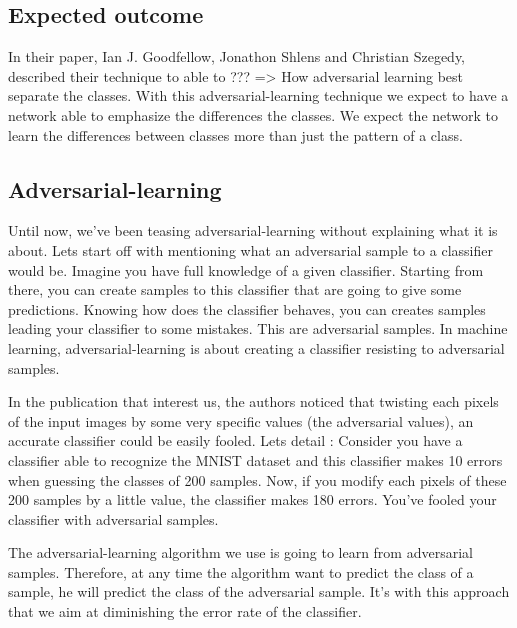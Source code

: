 	\subsection{Expected outcome}
		In their paper, Ian J. Goodfellow, Jonathon Shlens and Christian Szegedy, described their technique to able to ??? 
		=> How adversarial learning best separate the classes.
		With this adversarial-learning technique we expect to have a network able to emphasize the differences the classes. We expect the network to learn the differences between classes more than just the pattern of a class.


	\subsection{Adversarial-learning}
		Until now, we've been teasing adversarial-learning without explaining what it is about. Lets start off with mentioning what an adversarial sample to a classifier would be. Imagine you have full knowledge of a given classifier. Starting from there, you can create samples to this classifier that are going to give some predictions. Knowing how does the classifier behaves, you can creates samples leading your classifier to some mistakes. This are adversarial samples. In machine learning, adversarial-learning is about creating a classifier resisting to adversarial samples.

		In the publication that interest us\cite{goodfellow2014explaining}, the authors noticed that twisting each pixels of the input images by some very specific values (the adversarial values), an accurate classifier could be easily fooled. Lets detail : Consider you have a classifier able to recognize the MNIST dataset and this classifier makes 10 errors when guessing the classes of 200 samples. Now, if you modify each pixels of these 200 samples by a little value, the classifier makes 180 errors. You've fooled your classifier with adversarial samples.

		The adversarial-learning algorithm we use is going to learn from adversarial samples. Therefore, at any time the algorithm want to predict the class of a sample, he will predict the class of the adversarial sample. It's with this approach that we aim at diminishing the error rate of the classifier.


